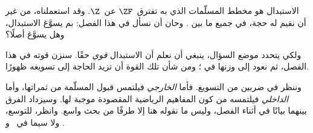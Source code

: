 \documentclass[../../../include/open-logic-section]{subfiles}
\begin{document}

الاستبدال هو مخطط المسلّمات الذي به تفترق~$\ZF$ عن~$\Z$. وقد
استعملناه، من غير أن نقيم له حجة، في جميع ما بين
. وحان أن نسأل في هذا
الفصل: بم يسوَّغ الاستبدال، وهل يسوَّغ أصلًا؟

ولكي يتحدد موضع السؤال، ينبغي أن نعلم أن الاستبدال \emph{قوي}
حقًا. سنزن قوته في هذا الفصل، ثم نعود إلى وزنها في
؛ ومن شأن تلك القوة أن تزيد
الحاجة إلى تسويغه ظهورًا.

وننظر في ضربين من التسويغ. فأما \emph{الخارجي} فيلتمس قبول
المسلّمة من ثمراتها، وأما \emph{الداخلي} فيلتمسه من كون المفاهيم
الرياضية المقصودة موجبة لها. وسيزداد الفرق بينهما بيانًا في أثناء
الفصل، وليس ما نقوله هنا إلا طرفًا من بحث واسع. وانظر، للتوسع، ولا
سيما \citeauthor{Maddy1988a} في~\citeyear{Maddy1988a} و
\citeyear{Maddy1988b}.
\end{document}

